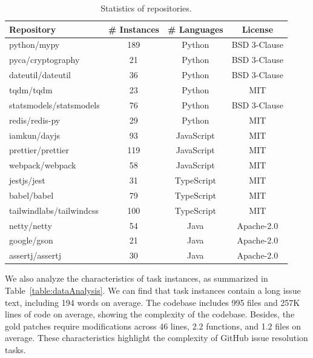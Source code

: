 \begin{table}[t]

\centering
\caption{Statistics of \Swebenchx repositories.}
\footnotesize
\tabmargin
\begin{tabular}{lccc}
\toprule
\textbf{Repository} & \textbf{\# Instances} & \textbf{\# Languages} & \textbf{License} \\
\midrule
python/mypy & 189 & Python & BSD 3-Clause \\
pyca/cryptography & 21 & Python & BSD 3-Clause  \\
dateutil/dateutil & 36 & Python & BSD 3-Clause \\
tqdm/tqdm & 23 & Python & MIT \\
statsmodels/statsmodels & 76 & Python & BSD 3-Clause \\
redis/redis-py & 29 & Python & MIT \\
iamkun/dayjs & 93 & JavaScript & MIT \\
prettier/prettier & 119 & JavaScript & MIT \\
webpack/webpack & 58 & JavaScript & MIT \\
jestjs/jest & 31 & TypeScript & MIT \\
babel/babel & 79 & TypeScript & MIT \\
tailwindlabs/tailwindcss & 100 & TypeScript & MIT \\
netty/netty & 54 & Java & Apache-2.0 \\
google/gson & 21 & Java & Apache-2.0 \\
assertj/assertj & 30 & Java & Apache-2.0 \\
\toprule
\end{tabular}

\label{table:statitics}
\end{table}

We also analyze the characteristics of task instances, as summarized in Table~\ref{table:dataAnalysis}. We can find that task instances contain a long issue text, including 194 words on average. The codebase includes 995 files and 257K lines of code on average, showing the complexity of the codebase. Besides, the gold patches require modifications across 46 lines, 2.2 functions, and 1.2 files on average. These characteristics highlight the complexity of GitHub issue resolution tasks.


